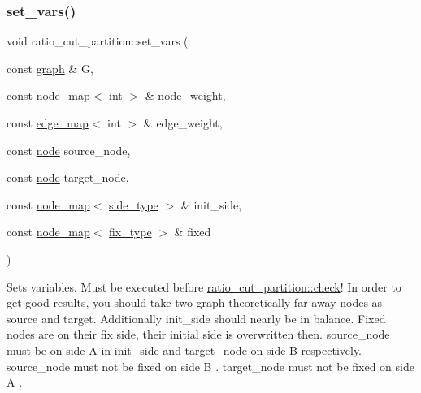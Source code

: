 \subsubsection{\texorpdfstring{set\+\_\+vars()}{set\_vars()}\hspace{0.1cm}{\footnotesize\ttfamily [5/5]}}
{\footnotesize\ttfamily void ratio\+\_\+cut\+\_\+partition\+::set\+\_\+vars (\begin{DoxyParamCaption}\item[{const \mbox{\hyperlink{classgraph}{graph}} \&}]{G,  }\item[{const \mbox{\hyperlink{classnode__map}{node\+\_\+map}}$<$ int $>$ \&}]{node\+\_\+weight,  }\item[{const \mbox{\hyperlink{classedge__map}{edge\+\_\+map}}$<$ int $>$ \&}]{edge\+\_\+weight,  }\item[{const \mbox{\hyperlink{classnode}{node}}}]{source\+\_\+node,  }\item[{const \mbox{\hyperlink{classnode}{node}}}]{target\+\_\+node,  }\item[{const \mbox{\hyperlink{classnode__map}{node\+\_\+map}}$<$ \mbox{\hyperlink{classratio__cut__partition_ace53442bd0c1e21fbf00858ec6f6b456}{side\+\_\+type}} $>$ \&}]{init\+\_\+side,  }\item[{const \mbox{\hyperlink{classnode__map}{node\+\_\+map}}$<$ \mbox{\hyperlink{classratio__cut__partition_a558dda40abda8ab03edb4605dbb81e36}{fix\+\_\+type}} $>$ \&}]{fixed }\end{DoxyParamCaption})}

Sets variables. Must be executed before \mbox{\hyperlink{classratio__cut__partition_a469c613c69db19cb63e492075346fea2}{ratio\+\_\+cut\+\_\+partition\+::check}}! In order to get good results, you should take two graph theoretically far away nodes as source and target. Additionally {\ttfamily init\+\_\+side} should nearly be in balance. Fixed nodes are on their fix side, their initial side is overwritten then. {\ttfamily source\+\_\+node} must be on side A in {\ttfamily init\+\_\+side } and {\ttfamily target\+\_\+node} on side B respectively. {\ttfamily source\+\_\+node} must not be fixed on side {\ttfamily B }. {\ttfamily target\+\_\+node} must not be fixed on side {\ttfamily A }.


